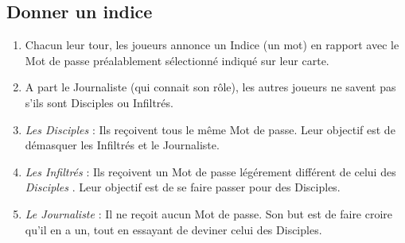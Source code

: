 \documentclass{article}%
\begin{document}
\subsection{ Donner un indice
}%
\label{subsec:Donnerunindice}%
\begin{enumerate}%
\item%
%
 Chacun leur tour, les joueurs annonce un Indice (un mot) en rapport avec le Mot de passe préalablement sélectionné indiqué sur leur carte.
%
\item%
%
 A part le Journaliste (qui connait son rôle), les autres joueurs ne savent pas s'ils sont Disciples ou Infiltrés.
%
\item%
%
\textit{Les Disciples}%
 : Ils reçoivent tous le même Mot de passe. Leur objectif est de démasquer les Infiltrés et le Journaliste.
%
\item%
%
\textit{Les Infiltrés}%
 : Ils reçoivent un Mot de passe légérement différent de celui des %
\textit{Disciples}%
. Leur objectif est de se faire passer pour des Disciples.
%
\item%
%
\textit{Le Journaliste}%
 : Il ne reçoit aucun Mot de passe. Son but est de faire croire qu'il en a un, tout en essayant de deviner celui des Disciples.
%
\end{enumerate}

%
\end{document}
